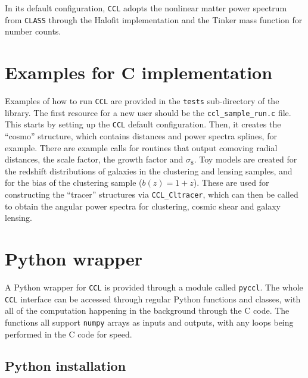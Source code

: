 \documentclass[\docopts]{\docclass}
\begin{document}
In its default configuration, {\tt CCL} adopts the nonlinear matter power spectrum from {\tt CLASS} through the Halofit implementation and the Tinker mass function for number counts.


\section{Examples for C implementation}
\label{sec:example}

Examples of how to run {\tt CCL} are provided in the {\tt tests} sub-directory of the library. The first resource for a new user should be the {\tt ccl\_sample\_run.c} file. This starts by setting up the {\tt CCL} default configuration. Then, it creates the ``cosmo'' structure, which contains distances and power spectra splines, for example. There are example calls for routines that output comoving radial distances, the scale factor, the growth factor and $\sigma_8$. Toy models are created for the redshift distributions of galaxies in the clustering and lensing samples, and for the bias of the clustering sample ($b(z)=1+z$). These are used for constructing the ``tracer'' structures via {\tt CCL\_Cltracer}, which can then be called to obtain the angular power spectra for clustering, cosmic shear and galaxy lensing.


\section{Python wrapper}
\label{sec:python}

A Python wrapper for {\tt CCL} is provided through a module called {\tt pyccl}. The whole {\tt CCL} interface can be accessed through regular Python functions and classes, with all of the computation happening in the background through the C code. The functions all support {\tt numpy} arrays as inputs and outputs, with any loops being performed in the C code for speed.

\subsection{Python installation}
\label{sec:python:install}
\end{document}
